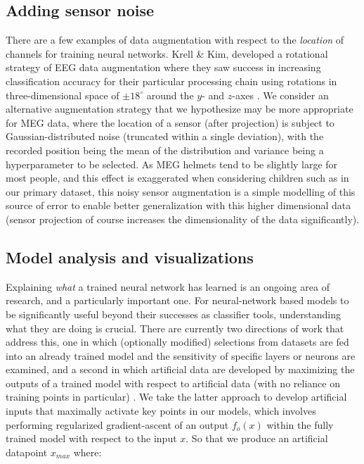 \documentclass[fleqn,10pt]{wlscirep}
\begin{document}
\subsection*{Adding sensor noise}

There are a few examples of data augmentation with respect to the {\em location} of channels for training neural networks. Krell \& Kim, developed a rotational strategy of EEG data augmentation where they saw success in increasing classification accuracy for their particular processing chain using rotations in three-dimensional space of $\pm 18^{\circ}$ around the $y$- and $z$-axes \cite{Krell2017}. We consider an alternative augmentation strategy that we hypothesize may be more appropriate for MEG data, where the location of a sensor (after projection) is subject to Gaussian-distributed noise (truncated within a single deviation), with the recorded position being the mean of the distribution and variance being a hyperparameter to be selected. As MEG helmets tend to be slightly large for most people, and this effect is exaggerated when considering children such as in our primary dataset, this noisy sensor augmentation is a simple modelling of this source of error to enable better generalization with this higher dimensional data (sensor projection of course increases the dimensionality of the data significantly).

\subsection*{Model analysis and visualizations} \label{sec:max_act}

Explaining {\em what} a trained neural network has learned is an ongoing area of research, and a particularly important one. For neural-network based models to be significantly useful beyond their successes as classifier tools, understanding what they are doing is crucial. There are currently two directions of work that address this, one in which (optionally modified) selections from datasets are fed into an already trained model and the sensitivity of specific layers or neurons are examined, and a second in which artificial data are developed by maximizing the outputs of a trained model with respect to artificial data (with no reliance on training points in particular) \cite{Yosinski2015}. We take the latter approach to develop artificial inputs that maximally activate key points in our models, which involves performing regularized gradient-ascent of an output $f_o(x)$ within the fully trained model with respect to the input $x$. So that we produce an artificial datapoint $x_{max}$ where:
\end{document}

